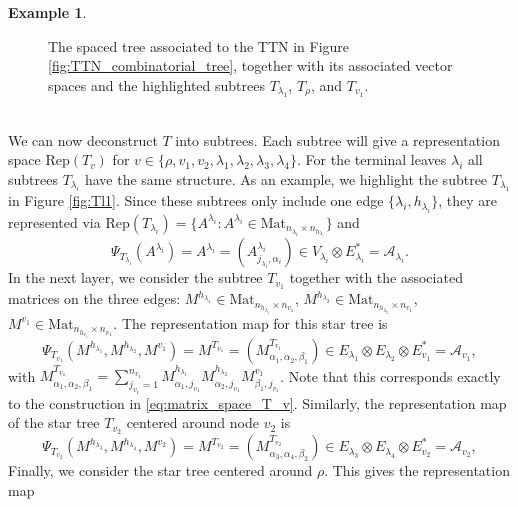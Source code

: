 \documentclass[12pt]{article}
\theoremstyle{definition}
\newtheorem{example}[theorem]{Example}
\numberwithin{theorem}{section}
\begin{document}
\begin{example}
\begin{figure}[htbp]
\caption{The spaced tree associated to the TTN in Figure \ref{fig:TTN_combinatorial_tree}, together with its associated vector spaces and the highlighted subtrees $T_{\lambda_1}$, $T_{\rho}$, and $T_{v_1}$.}
\label{fig:TTN_spaced_tree_combined}
\end{figure}
\\
We can now deconstruct $T$ into subtrees. Each subtree will give a representation space $\mathrm{Rep}(T_v)$ for $v \in \{\rho, v_1, v_2, \lambda_1, \lambda_2, \lambda_3, \lambda_4\}$. 
For the terminal leaves $\lambda_i$ all subtrees $T_{\lambda_i}$ have the same structure. As an example, we highlight the subtree $T_{\lambda_1}$ in Figure \ref{fig:Tl1}. Since these subtrees only include one edge $\{\lambda_i, h_{\lambda_i}\}$, they are represented via $\mathrm{Rep}(T_{\lambda_i}) = \{A^{\lambda_i}: A^{\lambda_i} \in \mathrm{Mat}_{n_{\lambda_i} \times n_{h_{\lambda_i}}}\}$ and 
\begin{equation*}
    \Psi_{T_{\lambda_i}}(A^{\lambda_i}) = A^{\lambda_i} = (A^{\lambda_i}_{j_{\lambda_i},\alpha_i}) \in V_{\lambda_i} \otimes E_{\lambda_i}^* = \mathcal{A}_{\lambda_i}.
\end{equation*}
In the next layer, we consider the subtree $T_{v_1}$ together with the associated matrices on the three edges: $M^{h_{\lambda_1}}\in\mathrm{Mat}_{n_{h_{\lambda_1}} \times n_{v_1}}$, $M^{h_{\lambda_2}}\in\mathrm{Mat}_{n_{h_{\lambda_2}} \times n_{v_1}}$, $M^{v_1}\in\mathrm{Mat}_{n_{h_{v_1}} \times n_{v_1}}$. The representation map for this star tree is 
\begin{equation*}
    \Psi_{T_{v_1}}(M^{h_{\lambda_1}}, M^{h_{\lambda_2}}, M^{v_1}) = M^{T_{v_1}} = (M^{T_{v_1}}_{\alpha_1, \alpha_2, \beta_1})\in E_{\lambda_1} \otimes E_{\lambda_2} \otimes E_{v_1}^* = \mathcal{A}_{v_1},
\end{equation*}
with $M^{T_{v_1}}_{\alpha_1, \alpha_2,\beta_1} = \sum_{j_{v_1}=1}^{n_{v_1}}M^{h_{\lambda_1}}_{\alpha_1, j_{v_1}}M^{h_{\lambda_2}}_{\alpha_2, j_{v_1}}M^{v_1}_{\beta_1,j_{v_1}}$. Note that this corresponds exactly to the construction in \eqref{eq:matrix_space_T_v}. Similarly, the representation map of the star tree $T_{v_2}$ centered around node $v_2$ is 
\begin{equation*}
    \Psi_{T_{v_2}}(M^{h_{\lambda_3}}, M^{h_{\lambda_4}}, M^{v_2}) = M^{T_{v_2}} = (M^{T_{v_2}}_{\alpha_3, \alpha_4, \beta_2})\in E_{\lambda_3} \otimes E_{\lambda_4} \otimes E_{v_2}^* = \mathcal{A}_{v_2},
\end{equation*}
Finally, we consider the star tree centered around $\rho$. This gives the representation map

\end{example}
\end{document}
